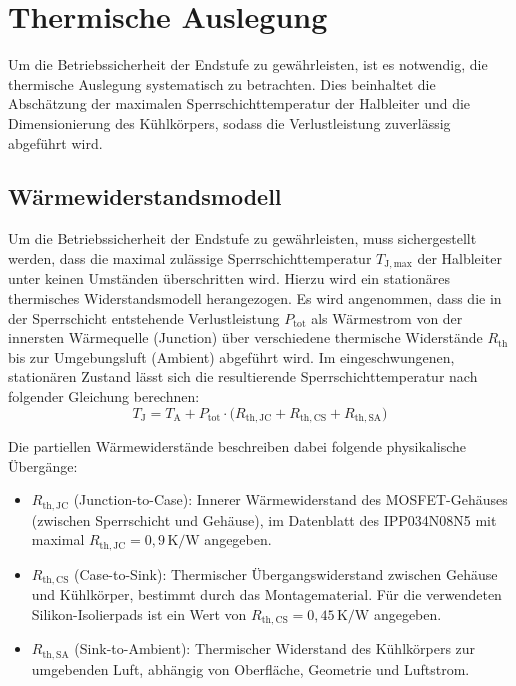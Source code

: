 \chapter{Thermische Auslegung}
\label{chap:thermik}

Um die Betriebssicherheit der Endstufe zu gewährleisten, ist es notwendig, die thermische Auslegung systematisch zu betrachten. Dies beinhaltet die Abschätzung der maximalen Sperrschichttemperatur der Halbleiter und die Dimensionierung des Kühlkörpers, sodass die Verlustleistung zuverlässig abgeführt wird.

\section{Wärmewiderstandsmodell}
\label{sec:thermik_modell}

Um die Betriebssicherheit der Endstufe zu gewährleisten, muss sichergestellt werden, dass die maximal zulässige Sperrschichttemperatur $T_{\mathrm{J,max}}$ der Halbleiter unter keinen Umständen überschritten wird. Hierzu wird ein stationäres thermisches Widerstandsmodell herangezogen. Es wird angenommen, dass die in der Sperrschicht entstehende Verlustleistung $P_{\mathrm{tot}}$ als Wärmestrom von der innersten Wärmequelle (Junction) über verschiedene thermische Widerstände $R_{\mathrm{th}}$ bis zur Umgebungsluft (Ambient) abgeführt wird.
Im eingeschwungenen, stationären Zustand lässt sich die resultierende Sperrschichttemperatur nach folgender Gleichung berechnen:
\begin{equation}
    T_\mathrm{J} = T_\mathrm{A} + P_{\mathrm{tot}} \cdot \bigl(R_{\mathrm{th,JC}} + R_{\mathrm{th,CS}} + R_{\mathrm{th,SA}}\bigr)
    \label{eq:thermik}
\end{equation}

Die partiellen Wärmewiderstände beschreiben dabei folgende physikalische Übergänge:
\begin{itemize}
    \item $R_{\mathrm{th,JC}}$ (Junction-to-Case): Innerer Wärmewiderstand des MOSFET-Gehäuses (zwischen Sperrschicht und Gehäuse), im Datenblatt des IPP034N08N5 mit maximal $R_{\mathrm{th,JC}} = 0{,}9\,\mathrm{K/W}$ angegeben.
    \item $R_{\mathrm{th,CS}}$ (Case-to-Sink): Thermischer Übergangswiderstand zwischen Gehäuse und Kühlkörper, bestimmt durch das Montagematerial. Für die verwendeten Silikon-Isolierpads ist ein Wert von $R_{\mathrm{th,CS}} = 0{,}45\,\mathrm{K/W}$ angegeben.
    \item $R_{\mathrm{th,SA}}$ (Sink-to-Ambient): Thermischer Widerstand des Kühlkörpers zur umgebenden Luft, abhängig von Oberfläche, Geometrie und Luftstrom.
\end{itemize}

